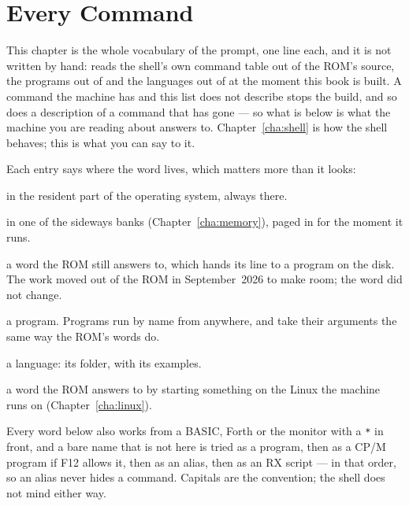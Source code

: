 \chapter{Every Command}\label{cha:commands}

This chapter is the whole vocabulary of the prompt, one line each, and it
is not written by hand:  reads the shell's own
command table out of the ROM's source, the programs out of
 and the languages out of  at the moment
this book is built. A command the machine has and this list does not
describe stops the build, and so does a description of a command that has
gone --- so what is below is what the machine you are reading about
answers to. Chapter~\ref{cha:shell} is how the shell behaves; this is what
you can say to it.

Each entry says where the word lives, which matters more than it looks:

\begin{description}[leftmargin=1.4em,style=nextline]
\item[ROM] in the resident part of the operating system, always there.
\item[ROM, bank \emph{n}] in one of the sideways banks
  (Chapter~\ref{cha:memory}), paged in for the moment it runs.
\item[runs MONITOR, runs TYPE] a word the ROM still answers to, which
  hands its line to a program on the disk. The work moved out of the ROM
  in September~2026 to make room; the word did not change.
\item[/SYSTEM/BIN] a program. Programs run by name from anywhere, and
  take their arguments the same way the ROM's words do.
\item[/LANG/\emph{name}] a language: its folder, with its examples.
\item[ROM, on the Linux] a word the ROM answers to by starting something
  on the Linux the machine runs on (Chapter~\ref{cha:linux}).
\end{description}

\noindent Every word below also works from a BASIC, Forth or the monitor
with a \verb|*| in front, and a bare name that is not here is tried as a
program, then as a CP/M program if F12 allows it, then as an alias, then as
an RX script --- in that order, so an alias never hides a command.
Capitals are the convention; the shell does not mind either way.


